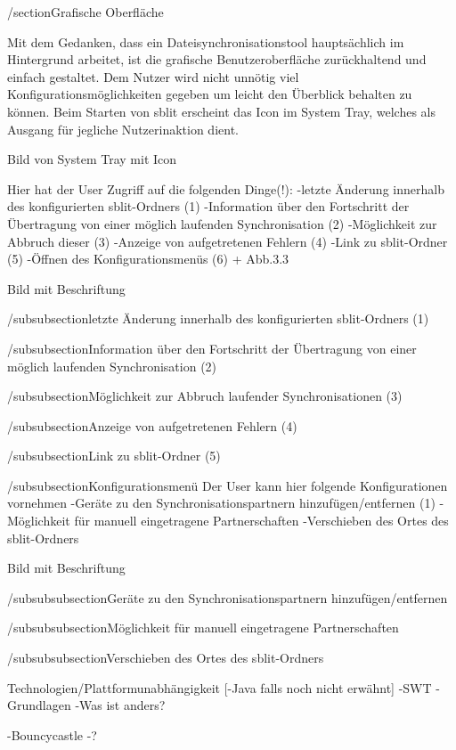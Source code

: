 /section{Grafische Oberfläche}

%
%

Mit dem Gedanken, dass ein Dateisynchronisationstool hauptsächlich im Hintergrund arbeitet, ist die grafische Benutzeroberfläche zurückhaltend und einfach gestaltet. Dem Nutzer wird nicht unnötig viel Konfigurationsmöglichkeiten gegeben um leicht den Überblick behalten zu können. 
Beim Starten von sblit erscheint das Icon im System Tray, welches als Ausgang für jegliche Nutzerinaktion dient.

{Bild von System Tray mit Icon}

%
%

Hier hat der User Zugriff auf die folgenden Dinge(!):
-letzte Änderung innerhalb des konfigurierten sblit-Ordners (1)
-Information über den Fortschritt der Übertragung von einer möglich laufenden Synchronisation (2)
-Möglichkeit zur Abbruch dieser (3)
-Anzeige von aufgetretenen Fehlern (4)
-Link zu sblit-Ordner (5)
-Öffnen des Konfigurationsmenüs  (6) + Abb.3.3

{Bild mit Beschriftung}

%
%
/subsubsection{letzte Änderung innerhalb des konfigurierten sblit-Ordners (1)}

/subsubsection{Information über den Fortschritt der Übertragung von einer möglich laufenden Synchronisation (2)}

/subsubsection{Möglichkeit zur Abbruch laufender Synchronisationen (3)}

/subsubsection{Anzeige von aufgetretenen Fehlern (4)}

/subsubsection{Link zu sblit-Ordner (5)}

/subsubsection{Konfigurationsmenü}
Der User kann hier folgende Konfigurationen vornehmen
-Geräte zu den Synchronisationspartnern hinzufügen/entfernen (1)
-Möglichkeit für manuell eingetragene Partnerschaften
-Verschieben des Ortes des sblit-Ordners

{Bild mit Beschriftung}

%
%
/subsubsubsection{Geräte zu den Synchronisationspartnern hinzufügen/entfernen}

/subsubsubsection{Möglichkeit für manuell eingetragene Partnerschaften}

/subsubsubsection{Verschieben des Ortes des sblit-Ordners}

Technologien/Plattformunabhängigkeit
[-Java falls noch nicht erwähnt]
-SWT
  -Grundlagen
  -Was ist anders?

-Bouncycastle
  -?
